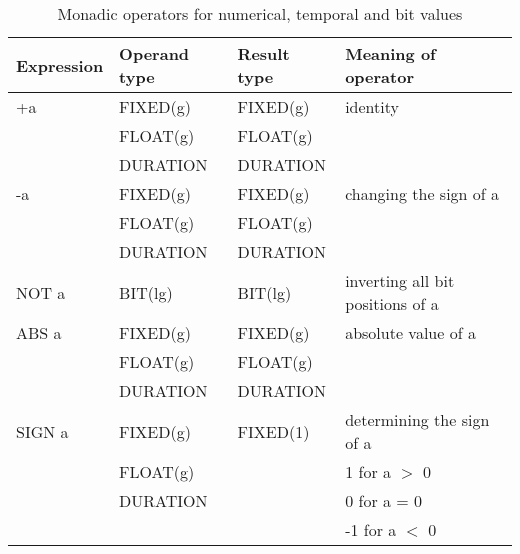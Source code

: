 \begin{table} %
\begin{center}
\caption{Monadic operators for numerical, temporal and bit values}
\label{tab_monadic_numeric_temp_bit}
\vspace{5mm}
\begin{tabular}{|l|l|l|l|} 
\hline
{\bf Expression} & {\bf Operand type} & {\bf Result type} & {\bf Meaning of operator}\\ \hline

+a               & FIXED(g)          & FIXED(g)         & identity\\
                 & FLOAT(g)          & FLOAT(g)         & \\
                 & DURATION          & DURATION         & \\ \hline

-a               & FIXED(g)          & FIXED(g)         & changing the sign of a\\
                 & FLOAT(g)          & FLOAT(g)         & \\
                 & DURATION          & DURATION         & \\ \hline

NOT a\index{NOT@\textbf{NOT}|textbf}
                 & BIT(lg)           & BIT(lg)          & inverting all bit positions of a\\ \hline

ABS a\index{ABS@\textbf{ABS}|textbf}
                 & FIXED(g)          & FIXED(g)         & absolute value of a\\
                 & FLOAT(g)          & FLOAT(g)         & \\
                 & DURATION          & DURATION         & \\ \hline

SIGN a
\index{SIGN@\textbf{SIGN}|textbf}
                 & FIXED(g)          & FIXED(1)         & determining the sign of a\\ 
                 & FLOAT(g)          &                  & 1 for a $>$ 0\\
                 & DURATION          &                  & 0 for a = 0\\   
                 &                   &                  & -1 for a $<$ 0\\
\hline
\end{tabular}
\end{center}
\end{table}

